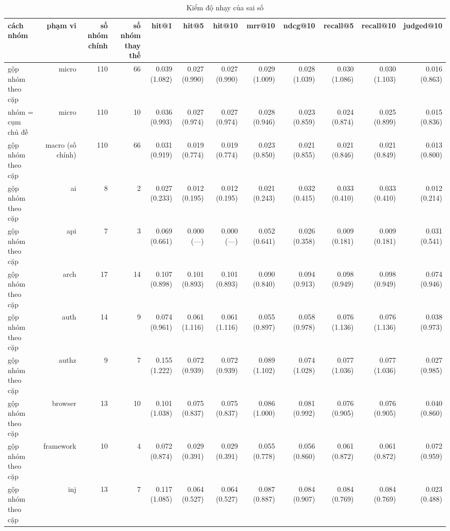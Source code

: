 \begin{table}[ht]
\centering
\caption{Kiểm độ nhạy của sai số}
\begin{tabular}{lrrrrrrrrrrr}
\toprule
cách nhóm & phạm vi & số nhóm chính & số nhóm thay thế & hit@1 & hit@5 & hit@10 & mrr@10 & ndcg@10 & recall@5 & recall@10 & judged@10 \\
\midrule
gộp nhóm theo cặp & micro & 110 & 66 & 0.039 (1.082) & 0.027 (0.990) & 0.027 (0.990) & 0.029 (1.009) & 0.028 (1.039) & 0.030 (1.086) & 0.030 (1.103) & 0.016 (0.863) \\
nhóm = cụm chủ đề & micro & 110 & 10 & 0.036 (0.993) & 0.027 (0.974) & 0.027 (0.974) & 0.028 (0.946) & 0.023 (0.859) & 0.024 (0.874) & 0.025 (0.899) & 0.015 (0.836) \\
gộp nhóm theo cặp & macro (số chính) & 110 & 66 & 0.031 (0.919) & 0.019 (0.774) & 0.019 (0.774) & 0.023 (0.850) & 0.021 (0.855) & 0.021 (0.846) & 0.021 (0.849) & 0.013 (0.800) \\
gộp nhóm theo cặp & ai & 8 & 2 & 0.027 (0.233) & 0.012 (0.195) & 0.012 (0.195) & 0.021 (0.243) & 0.032 (0.415) & 0.033 (0.410) & 0.033 (0.410) & 0.012 (0.214) \\
gộp nhóm theo cặp & api & 7 & 3 & 0.069 (0.661) & 0.000 (—) & 0.000 (—) & 0.052 (0.641) & 0.026 (0.358) & 0.009 (0.181) & 0.009 (0.181) & 0.031 (0.541) \\
gộp nhóm theo cặp & arch & 17 & 14 & 0.107 (0.898) & 0.101 (0.893) & 0.101 (0.893) & 0.090 (0.840) & 0.094 (0.913) & 0.098 (0.949) & 0.098 (0.949) & 0.074 (0.946) \\
gộp nhóm theo cặp & auth & 14 & 9 & 0.074 (0.961) & 0.061 (1.116) & 0.061 (1.116) & 0.055 (0.897) & 0.058 (0.978) & 0.076 (1.136) & 0.076 (1.136) & 0.038 (0.973) \\
gộp nhóm theo cặp & authz & 9 & 7 & 0.155 (1.222) & 0.072 (0.939) & 0.072 (0.939) & 0.089 (1.102) & 0.074 (1.028) & 0.077 (1.036) & 0.077 (1.036) & 0.027 (0.985) \\
gộp nhóm theo cặp & browser & 13 & 10 & 0.101 (1.038) & 0.075 (0.837) & 0.075 (0.837) & 0.086 (1.000) & 0.081 (0.992) & 0.076 (0.905) & 0.076 (0.905) & 0.040 (0.860) \\
gộp nhóm theo cặp & framework & 10 & 4 & 0.072 (0.874) & 0.029 (0.391) & 0.029 (0.391) & 0.055 (0.778) & 0.056 (0.860) & 0.061 (0.872) & 0.061 (0.872) & 0.072 (0.959) \\
gộp nhóm theo cặp & inj & 13 & 7 & 0.117 (1.085) & 0.064 (0.527) & 0.064 (0.527) & 0.087 (0.887) & 0.084 (0.907) & 0.084 (0.769) & 0.084 (0.769) & 0.023 (0.488) \\

\end{tabular}
\end{table}
